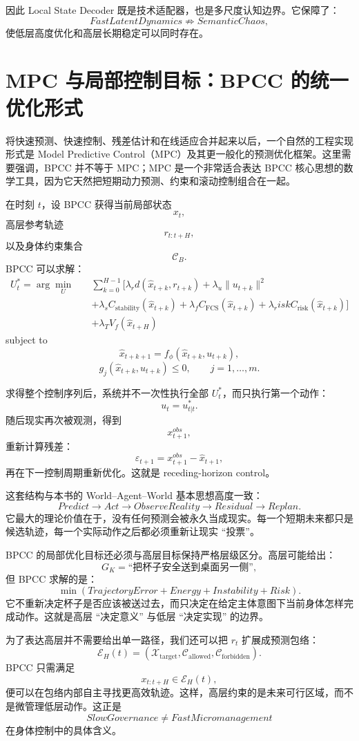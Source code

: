 因此 Local State Decoder 既是技术适配器，也是多尺度认知边界。它保障了：
\[
FastLatentDynamics
\not\Rightarrow
SemanticChaos,
\]
使低层高度优化和高层长期稳定可以同时存在。

\section{MPC 与局部控制目标：BPCC 的统一优化形式}

将快速预测、快速控制、残差估计和在线适应合并起来以后，一个自然的工程实现形式是 Model Predictive Control（MPC）及其更一般化的预测优化框架。这里需要强调，BPCC 并不等于 MPC；MPC 是一个非常适合表达 BPCC 核心思想的数学工具，因为它天然把短期动力预测、约束和滚动控制组合在一起。

在时刻 $t$，设 BPCC 获得当前局部状态
\[
x_t,
\]
高层参考轨迹
\[
r_{t:t+H},
\]
以及身体约束集合
\[
\mathcal C_B.
\]
BPCC 可以求解：
\[
\begin{aligned}
U_t^\ast
=
\arg\min_{U}
\quad&
\sum_{k=0}^{H-1}
\Big[
\lambda_r
d(\hat x_{t+k},r_{t+k})
+
\lambda_u
\|u_{t+k}\|^2
\\
&+
\lambda_s
C_{\mathrm{stability}}
(\hat x_{t+k})
+
\lambda_f
C_{\mathrm{FCS}}
(\hat x_{t+k})
+
\lambda_risk
C_{\mathrm{risk}}
(\hat x_{t+k})
\Big]
\\
&+
\lambda_T
V_f(\hat x_{t+H})
\end{aligned}
\]
subject to
\[
\hat x_{t+k+1}
=
f_\phi(
\hat x_{t+k},
u_{t+k}
),
\]
\[
g_j(
\hat x_{t+k},
u_{t+k}
)
\leq0,
\qquad
j=1,\ldots,m.
\]

求得整个控制序列后，系统并不一次性执行全部 $U_t^\ast$，而只执行第一个动作：
\[
u_t=u_{t|t}^\ast.
\]
随后现实再次被观测，得到
\[
x_{t+1}^{obs},
\]
重新计算残差：
\[
\varepsilon_{t+1}
=
x_{t+1}^{obs}
-
\hat x_{t+1},
\]
再在下一控制周期重新优化。这就是 receding-horizon control。

这套结构与本书的 World--Agent--World 基本思想高度一致：
\[
Predict
\rightarrow
Act
\rightarrow
ObserveReality
\rightarrow
Residual
\rightarrow
Replan.
\]
它最大的理论价值在于，没有任何预测会被永久当成现实。每一个短期未来都只是候选轨迹，每一个实际动作之后都必须重新让现实 ``投票''。

BPCC 的局部优化目标还必须与高层目标保持严格层级区分。高层可能给出：
\[
G_K=
\text{``把杯子安全送到桌面另一侧''},
\]
但 BPCC 求解的是：
\[
\min
\left(
TrajectoryError
+
Energy
+
Instability
+
Risk
\right).
\]
它不重新决定杯子是否应该被送过去，而只决定在给定主体意图下当前身体怎样完成动作。这就是高层 ``决定意义'' 与低层 ``决定实现'' 的边界。

为了表达高层并不需要给出单一路径，我们还可以把 $r_t$ 扩展成预测包络：
\[
\mathcal E_H(t)
=
\left(
\mathcal X_{\mathrm{target}},
\mathcal C_{\mathrm{allowed}},
\mathcal C_{\mathrm{forbidden}}
\right).
\]
BPCC 只需满足
\[
x_{t:t+H}
\in
\mathcal E_H(t),
\]
便可以在包络内部自主寻找更高效轨迹。这样，高层约束的是未来可行区域，而不是微管理低层动作。这正是
\[
SlowGovernance
\neq
FastMicromanagement
\]
在身体控制中的具体含义。

